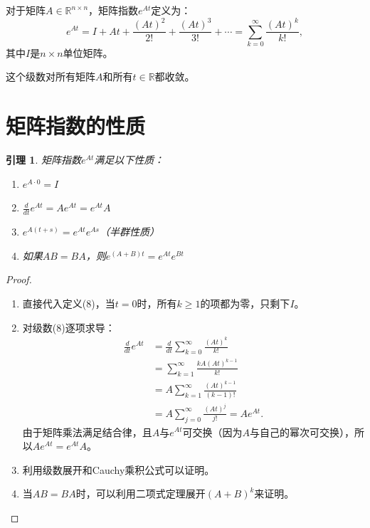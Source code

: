 \documentclass[12pt,a4paper]{article}
\newtheorem{lemma}{引理}
\newtheorem{proof}{证明}
\begin{document}
\begin{definition}[矩阵指数]
对于矩阵$A \in \mathbb{R}^{n \times n}$，矩阵指数$e^{At}$定义为：
\begin{equation}
e^{At} = I + At + \frac{(At)^2}{2!} + \frac{(At)^3}{3!} + \cdots = \sum_{k=0}^{\infty} \frac{(At)^k}{k!},
\end{equation}
其中$I$是$n \times n$单位矩阵。
\end{definition}

这个级数对所有矩阵$A$和所有$t \in \mathbb{R}$都收敛。

\section{矩阵指数的性质}

\begin{lemma}
矩阵指数$e^{At}$满足以下性质：
\begin{enumerate}
\item $e^{A \cdot 0} = I$
\item $\frac{d}{dt}e^{At} = Ae^{At} = e^{At}A$
\item $e^{A(t+s)} = e^{At}e^{As}$（半群性质）
\item 如果$AB = BA$，则$e^{(A+B)t} = e^{At}e^{Bt}$
\end{enumerate}
\end{lemma}

\begin{proof}
\begin{enumerate}
\item 直接代入定义(8)，当$t=0$时，所有$k \geq 1$的项都为零，只剩下$I$。

\item 对级数(8)逐项求导：
\begin{align}
\frac{d}{dt}e^{At} &= \frac{d}{dt}\sum_{k=0}^{\infty} \frac{(At)^k}{k!} \\
&= \sum_{k=1}^{\infty} \frac{kA(At)^{k-1}}{k!} \\
&= A\sum_{k=1}^{\infty} \frac{(At)^{k-1}}{(k-1)!} \\
&= A\sum_{j=0}^{\infty} \frac{(At)^j}{j!} = Ae^{At}.
\end{align}
由于矩阵乘法满足结合律，且$A$与$e^{At}$可交换（因为$A$与自己的幂次可交换），所以$Ae^{At} = e^{At}A$。

\item 利用级数展开和Cauchy乘积公式可以证明。

\item 当$AB = BA$时，可以利用二项式定理展开$(A+B)^k$来证明。
\end{enumerate}
\end{proof}
\end{document}
